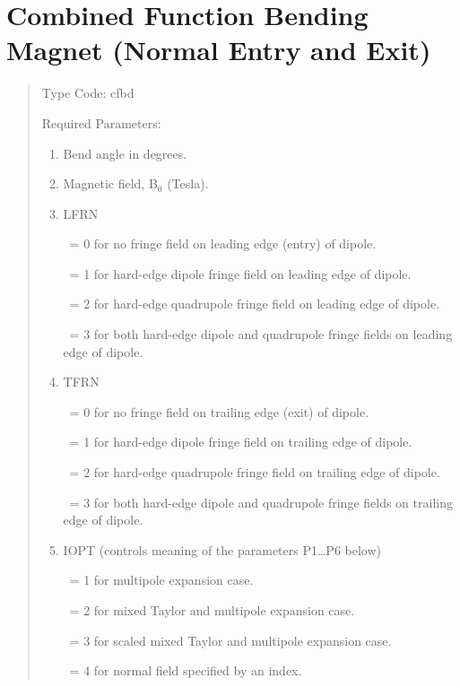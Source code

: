\newpage
\section{Combined Function Bending Magnet \protect\newline (Normal Entry and Exit)}
\begin{quotation}
\noindent Type Code:  cfbd   
\vspace{5mm}

\noindent Required Parameters:
\begin{enumerate}
  \item  Bend angle in degrees.
  \item  Magnetic field, B$_0$ (Tesla).
  \item  LFRN

         \ = 0 for no fringe field on leading edge (entry) of dipole.

         \ = 1 for hard-edge dipole fringe field on leading edge of dipole.

         \ = 2 for hard-edge quadrupole fringe field on leading edge of dipole.

         \ = 3 for both hard-edge dipole and quadrupole fringe fields on
		 leading edge \hspace*{1.5em}of dipole.

  \item  TFRN

         \ = 0 for no fringe field on trailing edge (exit) of dipole.

         \ = 1 for hard-edge dipole fringe field on trailing edge of dipole.

         \ = 2 for hard-edge quadrupole fringe field on trailing edge of dipole.

         \ = 3 for both hard-edge dipole and quadrupole fringe fields on
		 trailing edge \hspace*{1.5em}of dipole.

  \item  IOPT (controls meaning of the parameters P1\ldots P6 below)

         \ = 1 for multipole expansion case.

         \ = 2 for mixed Taylor and multipole expansion case.

         \ = 3 for scaled mixed Taylor and multipole expansion case.

        \ = 4 for normal field specified by an index.


\end{enumerate}
\end{quotation}
